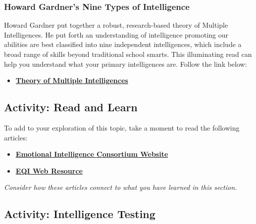 \documentclass[
]{book}
\providecommand{\tightlist}{%
  \setlength{\itemsep}{0pt}\setlength{\parskip}{0pt}}
\begin{document}
\hypertarget{howard-gardners-nine-types-of-intelligence}{%
\subsubsection*{Howard Gardner's Nine Types of Intelligence}\label{howard-gardners-nine-types-of-intelligence}}

Howard Gardner put together a robust, research-based theory of Multiple Intelligences. He put forth an understanding of intelligence promoting our abilities are best classified into nine independent intelligences, which include a broad range of skills beyond traditional school smarts. This illuminating read can help you understand what your primary intelligences are. Follow the link below:

\begin{itemize}
\tightlist
\item
  \href{https://www.niu.edu/citl/resources/guides/instructional-guide/gardners-theory-of-multiple-intelligences.shtml}{\textbf{Theory of Multiple Intelligences}}
\end{itemize}

\hypertarget{activity-read-and-learn}{%
\subsection*{Activity: Read and Learn}\label{activity-read-and-learn}}

\begin{reflect}
To add to your exploration of this topic, take a moment to read the following articles:

\begin{itemize}
\item
  \href{http://www.eiconsortium.org/}{\textbf{Emotional Intelligence Consortium Website}}
\item
  \href{https://eqi.org/eitoc.htm}{\textbf{EQI Web Resource}}
\end{itemize}

\emph{Consider how these articles connect to what you have learned in this section.}
\end{reflect}

\hypertarget{activity-intelligence-testing}{%
\subsection*{Activity: Intelligence Testing}\label{activity-intelligence-testing}}
\end{document}
